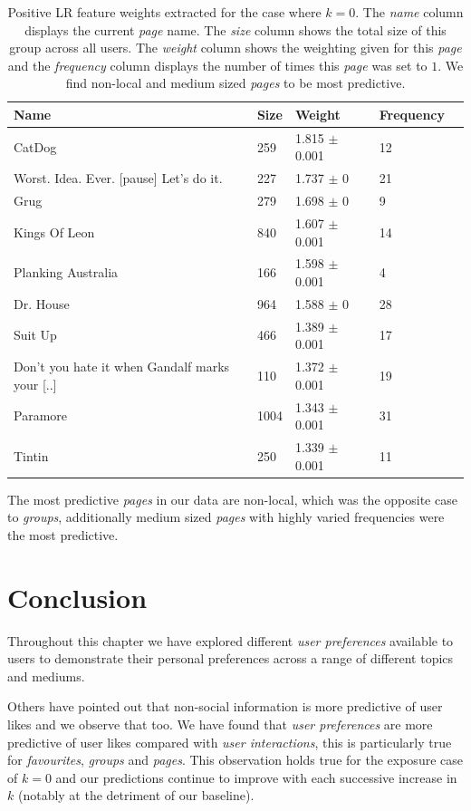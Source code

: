 \begin{table}[h]
\begin{minipage}[b]{1.0\textwidth}
\centering
  \begin{tabular}{|l|l|l|l|l|} %
  \hline
  \textbf{Name} & \textbf{Size} & \textbf{Weight} & \textbf{Frequency} \\ \hline
\small{CatDog}  & 259 & 1.815 $\pm$ 0.001 & 12 \\ \hline
\small{Worst. Idea. Ever. [pause] Let's do it.}  & 227 & 1.737 $\pm$ 0 & 21 \\ \hline
\small{Grug}  & 279 & 1.698 $\pm$ 0 & 9 \\ \hline
\small{Kings Of Leon}  & 840 & 1.607 $\pm$ 0.001 & 14 \\ \hline
\small{Planking Australia}  & 166 & 1.598 $\pm$ 0.001 & 4 \\ \hline
\small{Dr. House}  & 964 & 1.588 $\pm$ 0 & 28 \\ \hline
\small{Suit Up}  & 466 & 1.389 $\pm$ 0.001 & 17 \\ \hline
\small{Don't you hate it when Gandalf marks your [..]}  & 110 & 1.372 $\pm$ 0.001 & 19 \\ \hline
\small{Paramore}  & 1004 & 1.343 $\pm$ 0.001 & 31 \\ \hline
\small{Tintin}  & 250 & 1.339 $\pm$ 0.001 & 11 \\ \hline
  \end{tabular}
 \caption{Positive LR feature weights extracted for the case where $k=0$. The \emph{name} column displays the current \emph{page} name.
  The \emph{size} column shows the total size of this group across all users.
  The \emph{weight} column shows the weighting given for this \emph{page} and the \emph{frequency} column displays the number of times 
  this \emph{page} was set to $1$. We find non-local and medium sized \emph{pages} to be most predictive.}
\end{minipage}
\end{table}

The most predictive \emph{pages} in our data are non-local, which was the opposite case to \emph{groups}, additionally medium sized \emph{pages}
with highly varied frequencies were the most predictive.

\section{Conclusion}
\label{sec:conc}
Throughout this chapter we have explored different \emph{user preferences} available to users to demonstrate their personal preferences across a range of 
different topics and mediums.

Others have pointed out that non-social information is more predictive of user likes \cite{www} and we observe that too.
We have found that \emph{user preferences} are more predictive of user likes compared with \emph{user interactions}, this is particularly 
true for \emph{favourites}, \emph{groups} and \emph{pages}. This observation holds true for the exposure case of $k = 0$ and our 
predictions continue to improve with each successive increase in $k$ (notably at the detriment of our baseline).

